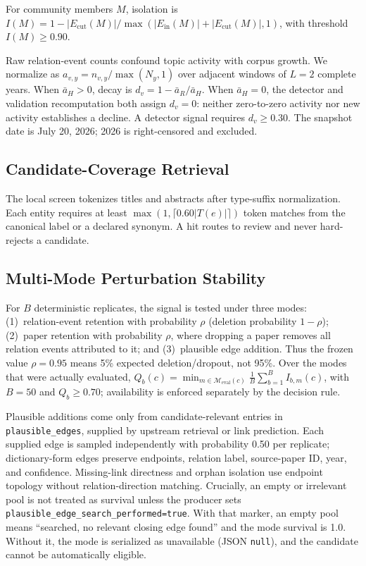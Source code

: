 \documentclass[conference, onecolumn]{IEEEtran}
\begin{document}
For community members $M$, isolation is $I(M)=1-{|E_{\mathrm{cut}}(M)|}/{\max(|E_{\mathrm{in}}(M)|+|E_{\mathrm{cut}}(M)|,1)}$, with threshold $I(M)\geq0.90$.

Raw relation-event counts confound topic activity with corpus growth. We normalize as $a_{v,y}={n_{v,y}}/{\max(N_y,1)}$ over adjacent windows of $L=2$ complete years. When $\bar{a}_H>0$, decay is $d_v=1-{\bar{a}_R}/{\bar{a}_H}$. When $\bar{a}_H=0$, the detector and validation recomputation both assign $d_v=0$: neither zero-to-zero activity nor new activity establishes a decline. A detector signal requires $d_v\geq0.30$. The snapshot date is July 20, 2026; 2026 is right-censored and excluded.

\subsection{Candidate-Coverage Retrieval}

The local screen tokenizes titles and abstracts after type-suffix normalization. Each entity requires at least $\max(1,\lceil0.60|T(e)|\rceil)$ token matches from the canonical label or a declared synonym. A hit routes to review and never hard-rejects a candidate.

\subsection{Multi-Mode Perturbation Stability}

For $B$ deterministic replicates, the signal is tested under three modes: (1)~relation-event retention with probability $\rho$ (deletion probability $1-\rho$); (2)~paper retention with probability $\rho$, where dropping a paper removes all relation events attributed to it; and (3)~plausible edge addition. Thus the frozen value $\rho=0.95$ means 5\% expected deletion/dropout, not 95\%. Over the modes that were actually evaluated, $Q_b(c)=\min_{m\in\mathcal{M}_{\mathrm{eval}}(c)}\frac{1}{B}\sum_{b=1}^{B}I_{b,m}(c)$, with $B=50$ and $Q_b\geq0.70$; availability is enforced separately by the decision rule.

Plausible additions come only from candidate-relevant entries in \texttt{plausible\_edges}, supplied by upstream retrieval or link prediction. Each supplied edge is sampled independently with probability 0.50 per replicate; dictionary-form edges preserve endpoints, relation label, source-paper ID, year, and confidence. Missing-link directness and orphan isolation use endpoint topology without relation-direction matching. Crucially, an empty or irrelevant pool is not treated as survival unless the producer sets \texttt{plausible\_edge\_search\_performed=true}. With that marker, an empty pool means ``searched, no relevant closing edge found'' and the mode survival is 1.0. Without it, the mode is serialized as unavailable (JSON \texttt{null}), and the candidate cannot be automatically eligible.
\end{document}
